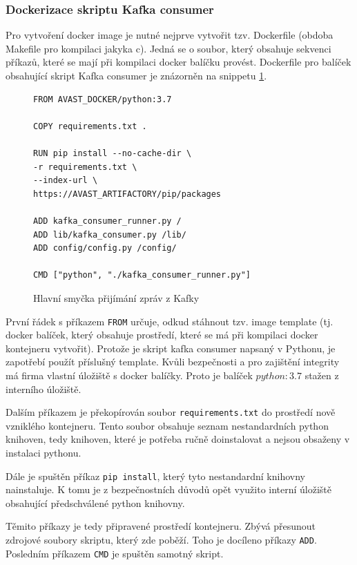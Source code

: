 \documentclass[thesis=M,czech,hidelinks]{FITthesis}[2013/05/06]
\begin{document}
\subsubsection{Dockerizace skriptu Kafka consumer} 
Pro vytvoření docker image je nutné nejprve vytvořit tzv. Dockerfile (obdoba Makefile pro kompilaci jakyka c). Jedná se o soubor, který obsahuje sekvenci příkazů, které se mají při kompilaci docker balíčku provést. Dockerfile pro balíček obsahující skript Kafka consumer je znázorněn na snippetu \ref{snip:docker}.

\begin{figure}[h]               
	\begin{verbatim}
FROM AVAST_DOCKER/python:3.7

COPY requirements.txt .

RUN pip install --no-cache-dir \
-r requirements.txt \
--index-url \
https://AVAST_ARTIFACTORY/pip/packages

ADD kafka_consumer_runner.py /
ADD lib/kafka_consumer.py /lib/
ADD config/config.py /config/

CMD ["python", "./kafka_consumer_runner.py"]
	\end{verbatim}      
	\caption{Hlavní smyčka přijímání zpráv z Kafky}
	\label{snip:docker}
\end{figure}

První řádek s příkazem \texttt{FROM} určuje, odkud stáhnout tzv. image template (tj. docker balíček, který obsahuje prostředí, které se má při kompilaci docker kontejneru vytvořit). Protože je skript kafka consumer napsaný v Pythonu, je zapotřebí použít příslušný template. Kvůli bezpečnosti a pro zajištění integrity má firma vlastní úložiště s docker balíčky. Proto je balíček $python:3.7$ stažen z interního úložiště.

Dalším příkazem je překopírován soubor \texttt{requirements.txt} do prostředí nově vzniklého kontejneru. Tento soubor obsahuje seznam nestandardních python knihoven, tedy knihoven, které je potřeba ručně doinstalovat a nejsou obsaženy v instalaci pythonu.

Dále je spuštěn příkaz \texttt{pip install}, který tyto nestandardní knihovny nainstaluje. K tomu je z bezpečnostních důvodů opět využito interní úložiště obsahující předschválené python knihovny.

Těmito příkazy je tedy připravené prostředí kontejneru. Zbývá přesunout zdrojové soubory skriptu, který zde poběží. Toho je docíleno příkazy \texttt{ADD}. Posledním příkazem \texttt{CMD} je spuštěn samotný skript.
\end{document}
